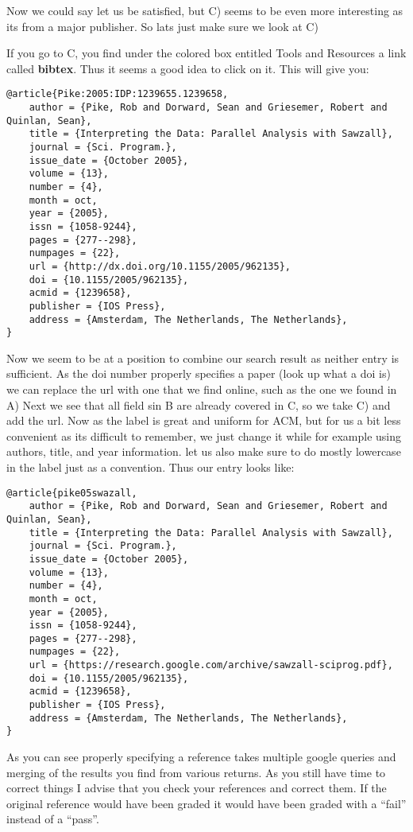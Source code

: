 Now we could say let us be satisfied, but C) seems to be even more
interesting as its from a major publisher. So lats just make sure we
look at C)

If you go to C, you find under the colored box entitled Tools and
Resources a link called \textbf{bibtex}. Thus it seems a good idea to
click on it. This will give you:

\begin{verbatim}
@article{Pike:2005:IDP:1239655.1239658,
    author = {Pike, Rob and Dorward, Sean and Griesemer, Robert and Quinlan, Sean},
    title = {Interpreting the Data: Parallel Analysis with Sawzall},
    journal = {Sci. Program.},
    issue_date = {October 2005},
    volume = {13},
    number = {4},
    month = oct,
    year = {2005},
    issn = {1058-9244},
    pages = {277--298},
    numpages = {22},
    url = {http://dx.doi.org/10.1155/2005/962135},
    doi = {10.1155/2005/962135},
    acmid = {1239658},
    publisher = {IOS Press},
    address = {Amsterdam, The Netherlands, The Netherlands},
}
\end{verbatim}

Now we seem to be at a position to combine our search result as neither
entry is sufficient. As the doi number properly specifies a paper (look
up what a doi is) we can replace the url with one that we find online,
such as the one we found in A) Next we see that all field sin B are
already covered in C, so we take C) and add the url. Now as the label is
great and uniform for ACM, but for us a bit less convenient as its
difficult to remember, we just change it while for example using
authors, title, and year information. let us also make sure to do mostly
lowercase in the label just as a convention. Thus our entry looks like:

\begin{verbatim}
@article{pike05swazall,
    author = {Pike, Rob and Dorward, Sean and Griesemer, Robert and Quinlan, Sean},
    title = {Interpreting the Data: Parallel Analysis with Sawzall},
    journal = {Sci. Program.},
    issue_date = {October 2005},
    volume = {13},
    number = {4},
    month = oct,
    year = {2005},
    issn = {1058-9244},
    pages = {277--298},
    numpages = {22},
    url = {https://research.google.com/archive/sawzall-sciprog.pdf},
    doi = {10.1155/2005/962135},
    acmid = {1239658},
    publisher = {IOS Press},
    address = {Amsterdam, The Netherlands, The Netherlands},
}
\end{verbatim}

As you can see properly specifying a reference takes multiple google
queries and merging of the results you find from various returns. As
you still have time to correct things I advise that you check your
references and correct them. If the original reference would have been
graded it would have been graded with a ``fail'' instead of a ``pass''.

